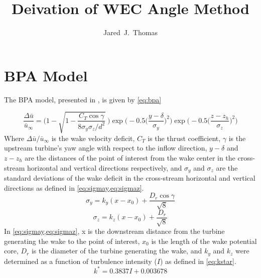 \documentclass{article}
\title{Deivation of WEC Angle Method}
\author{Jared~J.~Thomas}
\begin{document}
	\maketitle
	\section{BPA Model}
	
	The BPA model, presented in \cite{bastankhah2016}, is given by \cref{eq:bpa}
	
	\begin{equation}
	\frac{\Delta \bar{u}}{\bar{u}_{\infty}} = \Bigg(1-\sqrt{1-\frac{C_T \cos{\gamma}}{8 \sigma_y \sigma_z/d^2}}~\Bigg) \exp{\bigg(-0.5\Big(\frac{y-\delta}{\sigma_y}\Big)^2\bigg)}\exp{\bigg(-0.5\Big(\frac{z-z_h}{\sigma_z}\Big)^2\bigg)}
	\label{eq:bpa}
	\end{equation}
	Where $\Delta \bar{u} / \bar{u}_{\infty}$ is the wake velocity deficit, $C_T$ is the thrust coefficient, $\gamma$ is the upstream turbine's yaw angle with respect to the inflow direction, $y-\delta$ and $z-z_h$ are the distances of the point of interest from the wake center in the cross-stream horizontal and vertical directions respectively, and $\sigma_y$ and $\sigma_z$ are the standard deviations of the wake deficit in the cross-stream horizontal and vertical directions as defined in \cref{eq:sigmay,eq:sigmaz}.
	\begin{equation}\label{eq:sigmay}
	\sigma_y = k_y (x - x_0) + \frac{D_r \cos{\gamma}}{\sqrt{8}}
	\end{equation}
	\begin{equation}\label{eq:sigmaz}
	\sigma_z = k_z (x - x_0) + \frac{D_r}{\sqrt{8}}
	\end{equation}
	In \cref{eq:sigmay,eq:sigmaz}, x is the downstream distance from the turbine generating the wake to the point of interest, $x_0$ is the length of the wake potential core, $D_r$ is the diameter of the turbine generating the wake, and $k_y$ and $k_z$ were determined as a function of turbulence intensity ($I$) as defined in \cref{eq:kstar}\cite{niayifar2016}.
	\begin{equation}\label{eq:kstar}
	k^* = 0.3837I + 0.003678
	\end{equation}
	
\end{document}
